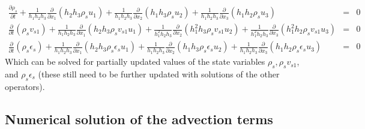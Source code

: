 \documentclass[11pt,letterpaper]{article}
\begin{document}
\begin{eqnarray}
\frac{\partial \rho_s}{\partial t} + \frac{1}{h_1 h_2 h_3} \frac{\partial}{\partial x_1} \left( h_2 h_3 \rho_s u_1 \right) + \frac{1}{h_1 h_2 h_3} \frac{\partial}{\partial x_2} \left( h_1 h_3 \rho_s u_2 \right) + \frac{1}{h_1 h_2 h_3} \frac{\partial}{\partial x_3} \left( h_1 h_2 \rho_s u_3 \right) &=& 0 \nonumber \\
\frac{\partial}{\partial t} \left( \rho_s v_{s1} \right) + \frac{1}{h_1 h_2 h_3} \frac{\partial}{\partial x_1} \left( h_2 h_3 \rho_s v_{s1} u_1 \right) + \frac{1}{h_1^2 h_2 h_3} \frac{\partial}{\partial x_2} \left( h_1^2 h_3 \rho_s v_{s1} u_2 \right) + \frac{1}{h_1^2 h_2 h_3} \frac{\partial}{\partial x_3} \left( h_1^2 h_2 \rho_s v_{s1} u_3 \right) &=& 0 \nonumber \\
\frac{\partial}{\partial t} \left( \rho_s \epsilon_s \right) + \frac{1}{h_1 h_2 h_3} \frac{\partial}{\partial x_1} \left( h_2 h_3 \rho_s \epsilon_s u_1 \right) + \frac{1}{h_1 h_2 h_3} \frac{\partial}{\partial x_2} \left( h_1 h_3 \rho_s \epsilon_s u_2 \right) + \frac{1}{h_1 h_2 h_3} \frac{\partial}{\partial x_3} \left( h_1 h_2 \rho_s \epsilon_s u_3 \right) &=& 0 \nonumber 
\end{eqnarray}
Which can be solved for partially updated values of the state variables $\rho_s,\rho_s v_{s1}$, and $\rho_s \epsilon_s$ (these still need to be further updated with solutions of the other operators).  


\subsection{Numerical solution of the advection terms}
\end{document}
